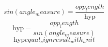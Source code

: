 \[sin({angle_measure})=\frac{{{opp_length}}}{{\text{{{hyp}}}}}\]
\[\text{{{hyp}}}=\frac{{{opp_length}}}{{sin({angle_measure})}}\]
\[\text{{{hyp}}}{equal_sign}{result_with_unit}\]
